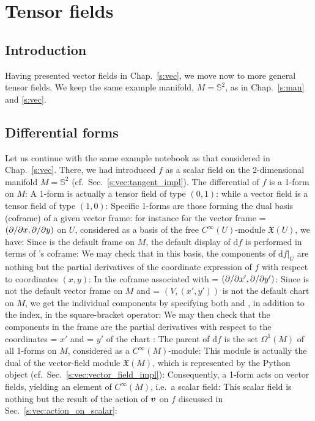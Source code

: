 \chapter{Tensor fields} \label{s:ten}

\minitoc

\section{Introduction}

Having presented vector fields in Chap.~\ref{s:vec}, we move now to more
general tensor fields. We keep the same example manifold, $M = \mathbb{S}^2$,
as in Chap.~\ref{s:man} and \ref{s:vec}.

\section{Differential forms}

Let us continue with the same example notebook as that considered in
Chap.~\ref{s:vec}. There, we had introduced $f$ as a scalar field on
the 2-dimensional manifold $M = \mathbb{S}^2$ (cf.\ Sec.~\ref{s:vec:tangent_impl}).
The differential of $f$ is a 1-form on $M$:
A 1-form is actually a tensor field of type $(0,1)$:
while a vector field is a tensor field of type $(1,0)$:
Specific 1-forms are those forming the dual basis (coframe) of a given vector
frame: for instance for the vector frame  = $({\partial }/{\partial x},{\partial }/{\partial y})$
on $U$, considered as a basis of the free $C^\infty(U)$-module $\mathfrak{X}(U)$,
we have:
Since  is the default frame on $M$, the default display of $\mathrm{d}f$
is performed in terms of 's coframe:
We may check that in this basis, the components of $\left. \mathrm{d}f \right| _U$
are nothing but the partial derivatives of the coordinate expression of $f$
with respect to coordinates $(x,y)$:
In the coframe associated with  = $({\partial }/{\partial x'},{\partial }/{\partial y'})$:
Since  is not the default vector frame on $M$ and  = $(V,(x',y'))$
is not the default chart on $M$, we get the individual components by
specifying both  and , in addition to the index, in the
square-bracket operator:
We may then check that the components in the frame 
are the partial derivatives with respect to the coordinates  = $x'$ and
 = $y'$ of the chart :
The parent of $\mathrm{d}f$ is the set $\Omega^1(M)$ of all 1-forms on $M$,
considered as a $C^\infty(M)$-module:
This module is actually the dual of the vector-field module $\mathfrak{X}(M)$,
which is represented
by the Python object  (cf.\ Sec.~\ref{s:vec:vector_field_impl}):
Consequently, a 1-form acts on vector fields, yielding an element of
$C^\infty(M)$, i.e.\ a scalar field:
This scalar field is nothing but the result of the action of $\bm{v}$ on $f$
discussed in Sec.~\ref{s:vec:action_on_scalar}:

